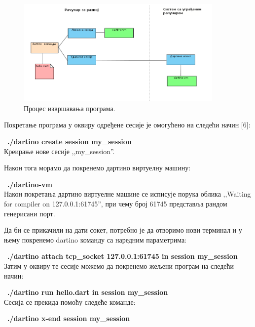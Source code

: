 \documentclass[12pt,oneside]{memoir}
\begin{document}
\begin{figure}[!ht]
  \centering
  \includegraphics[width=0.9\textwidth]{sesije.png}
  \caption{Процес извршавања програма.}
  \label{fig:izvrsavanje}
\end{figure}

Покретање програма у оквиру одређене сесије је омогућено на следећи начин [6]:

~\textbf{./dartino create session my\_session}\\
Креирање нове сесије ,,my\_session''.

Након тога морамо да покренемо дартино виртуелну машину:

~\textbf{./dartino-vm}\\
Након покретања дартино виртуелне машине се исписује порука облика ,,Waiting for compiler on 127.0.0.1:61745'', при чему број 61745 представља рандом генерисани порт.

Да би се прикачили на дати сокет, потребно је да отворимо нови терминал и у њему покренемо dartino команду са наредним параметрима:

~\textbf{./dartino attach tcp\_socket 127.0.0.1:61745 in session my\_session}\\

Затим у оквиру те сесије можемо да покренемо жељени програм на следећи начин:

~\textbf{./dartino run hello.dart in session my\_session}\\

Сесија се прекида помоћу следеће команде:

~\textbf{./dartino x-end session my\_session}\\


\end{document}
